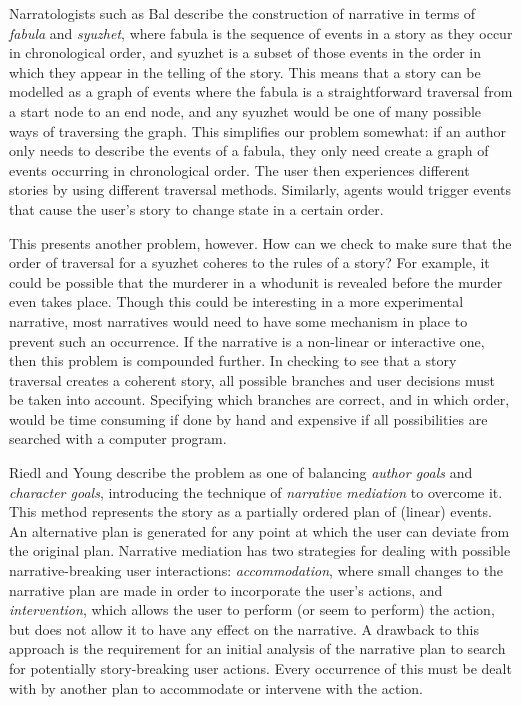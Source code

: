 \documentclass{llncs}
\begin{document}
Narratologists such as Bal \cite{bal2009narratology} describe the construction of narrative in terms of \emph{fabula} and \emph{syuzhet}, where fabula is the sequence of events in a story as they occur in chronological order, and syuzhet is a subset of those events in the order in which they appear in the telling of the story. This means that a story can be modelled as a graph of events where the fabula is a straightforward traversal from a start node to an end node, and any syuzhet would be one of many possible ways of traversing the graph.
This simplifies our problem somewhat: if an author only needs to describe the events of a fabula, they only need create a graph of events occurring in chronological order. The user then experiences different stories by using different traversal methods. Similarly, agents would trigger events that cause the user's story to change state in a certain order.

This presents another problem, however. How can we check to make sure that the order of traversal for a syuzhet coheres to the rules of a story? For example, it could be possible that the murderer in a whodunit is revealed before the murder even takes place. Though this could be interesting in a more experimental narrative, most narratives would need to have some mechanism in place to prevent such an occurrence.
If the narrative is a non-linear or interactive one, then this problem is compounded further. In checking to see that a story traversal creates a coherent story, all possible branches and user decisions must be taken into account. Specifying which branches are correct, and in which order, would be time consuming if done by hand and expensive if all possibilities are searched with a computer program.

Riedl and Young \cite{riedl2010narrative} describe the problem as one of balancing \emph{author goals} and \emph{character goals}, introducing the technique of \emph{narrative mediation} to overcome it. This method represents the story as a partially ordered plan of (linear) events. An alternative plan is generated for any point at which the user can deviate from the original plan.
Narrative mediation has two strategies for dealing with possible narrative-breaking user interactions: \emph{accommodation}, where small changes to the narrative plan are made in order to incorporate the user's actions, and \emph{intervention}, which allows the user to perform (or seem to perform) the action, but does not allow it to have any effect on the narrative.
A drawback to this approach is the requirement for an initial analysis of the narrative plan to search for potentially story-breaking user actions. Every occurrence of this must be dealt with by another plan to accommodate or intervene with the action.
\end{document}
